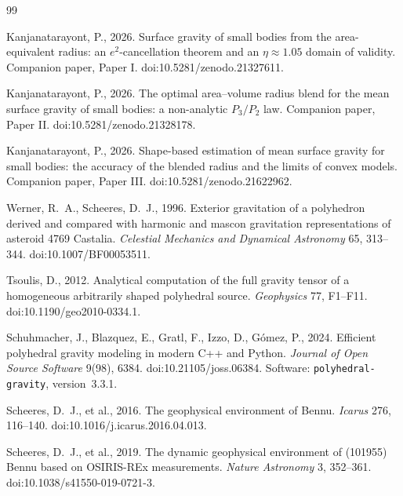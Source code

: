 \documentclass[11pt,a4paper]{article}
\newcommand{\Ptwo}{P_{2}}
\newcommand{\Pthree}{P_{3}}
\begin{document}
\begin{thebibliography}{99}

Kanjanatarayont, P., 2026. Surface gravity of small bodies from the
area-equivalent radius: an $e^{2}$-cancellation theorem and an
{$\eta \approx 1.05$} domain of validity. Companion paper, Paper I.
doi:10.5281/zenodo.21327611.

Kanjanatarayont, P., 2026. The optimal area--volume radius blend for the
mean surface gravity of small bodies: a non-analytic $\Pthree/\Ptwo$ law.
Companion paper, Paper II. doi:10.5281/zenodo.21328178.

Kanjanatarayont, P., 2026. Shape-based estimation of mean surface gravity
for small bodies: the accuracy of the blended radius and the limits of
convex models. Companion paper, Paper III. doi:10.5281/zenodo.21622962.

Werner, R.~A., Scheeres, D.~J., 1996. Exterior gravitation of a
polyhedron derived and compared with harmonic and mascon gravitation
representations of asteroid 4769 Castalia. \emph{Celestial Mechanics
and Dynamical Astronomy} 65, 313--344. doi:10.1007/BF00053511.

Tsoulis, D., 2012. Analytical computation of the full gravity tensor
of a homogeneous arbitrarily shaped polyhedral source. \emph{Geophysics}
77, F1--F11. doi:10.1190/geo2010-0334.1.

Schuhmacher, J., Blazquez, E., Gratl, F., Izzo, D., G\'omez, P., 2024.
Efficient polyhedral gravity modeling in modern C++ and Python.
\emph{Journal of Open Source Software} 9(98), 6384.
doi:10.21105/joss.06384. Software: \texttt{polyhedral-gravity}, version~3.3.1.

Scheeres, D.~J., et al., 2016. The geophysical environment of Bennu.
\emph{Icarus} 276, 116--140. doi:10.1016/j.icarus.2016.04.013.

Scheeres, D.~J., et al., 2019. The dynamic geophysical environment of
(101955) Bennu based on OSIRIS-REx measurements. \emph{Nature Astronomy}
3, 352--361. doi:10.1038/s41550-019-0721-3.


\end{thebibliography}
\end{document}

